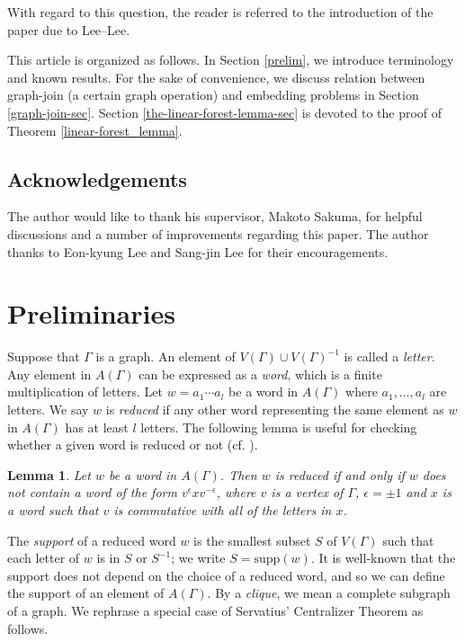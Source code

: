 \documentclass{amsart}
\theoremstyle{definition}
\theoremstyle{plain}
\newtheorem{lemma}[definition]{Lemma}
\numberwithin{equation}{section}
\begin{document}
With regard to this question, the reader is referred to the introduction of the paper \cite[Question 1.5]{Lee--Lee17} due to Lee--Lee. 

This article is organized as follows. 
In Section \ref{prelim}, we introduce terminology and known results. 
For the sake of convenience, we discuss relation between graph-join (a certain graph operation) and embedding problems in Section \ref{graph-join-sec}. 
Section \ref{the-linear-forest-lemma-sec} is devoted to the proof of Theorem \ref{linear-forest_lemma}. 


\subsection*{Acknowledgements}
The author would like to thank his supervisor, Makoto Sakuma, for helpful discussions and a number of improvements regarding this paper. 
The author thanks to Eon-kyung Lee and Sang-jin Lee for their encouragements. 

\section{Preliminaries \label{prelim}}

Suppose that $\Gamma$ is a graph. 
An element of $V(\Gamma) \cup V(\Gamma)^{-1}$ is called a {\it letter}. 
Any element in $A(\Gamma)$ can be expressed as a {\it word}, which is a finite multiplication of letters. 
Let $w= a_1 \cdots a_l$ be a word in $A(\Gamma)$ where $a_1, \ldots, a_l$ are letters. 
We say $w$ is {\it reduced} if any other word representing the same element as $w$ in $A(\Gamma)$ has at least $l$ letters. 
The following lemma is useful for checking whether a given word is reduced or not (cf. \cite[Section 5]{Crisp--Wiest04}). 

\begin{lemma}
Let $w$ be a word in $A(\Gamma)$. 
Then $w$ is reduced if and only if $w$ does not contain a word of the form $v^{\epsilon}xv^{- \epsilon}$, where $v$ is a vertex of $\Gamma$, $\epsilon = \pm 1$ and $x$ is a word such that $v$ is commutative with all of the letters in $x$. 
\label{reduced}
\end{lemma}

The {\it support} of a reduced word $w$ is the smallest subset $S$ of $V(\Gamma)$ such that each letter of $w$ is in $S$ or $S^{-1}$; we write $S= \mathrm{supp}(w)$. 
It is well-known that the support does not depend on the choice of a reduced word, and so we can define the support of an element of $A(\Gamma)$. 
By a {\it clique}, we mean a complete subgraph of a graph. 
We rephrase a special case of Servatius' Centralizer Theorem {\cite[The Centralizer Theorem in Section III]{Servatius89}} as follows. 
\end{document}
